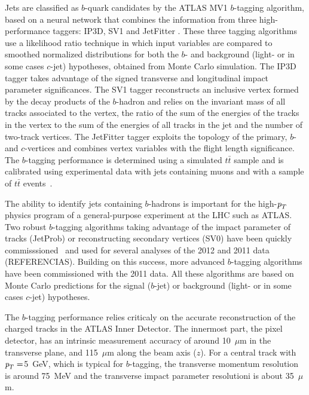 \begin{itemize}
Jets are classified as $b$-quark candidates by the ATLAS MV1 $b$-tagging algorithm, based on a neural network that combines the information from three high-performance taggers: IP3D, SV1 and JetFitter \cite{ATLAS-CONF-2011-102}.  These three tagging algorithms use a likelihood ratio technique in which input variables are compared to smoothed normalized distributions for both the $b$- and background (light- or in some cases $c$-jet) hypotheses, obtained from Monte Carlo simulation.  The IP3D tagger takes advantage of the signed transverse and longitudinal impact parameter significances. The SV1 tagger reconstructs an inclusive vertex formed by the decay products of the $b$-hadron and relies on the invariant mass of all tracks associated to the vertex, the ratio of the sum of the energies of the tracks in the vertex to the sum of the energies of all tracks in the jet and the number of two-track vertices. The JetFitter tagger exploits the topology of the primary, $b$- and $c$-vertices and combines vertex variables with the flight length significance.  The $b$-tagging performance is determined using a simulated $t\bar{t}$ sample and is calibrated using experimental data with jets containing muons and with a sample of $t\bar{t}$ events~\cite{ATLAS-CONF-2011-089}.




The ability to identify jets containing $b$-hadrons is important for the high-${\emph{p}_{T}}$ physics program of a general-purpose experiment at the LHC such as ATLAS. Two robust $b$-tagging algorithms taking advantage of the impact parameter of tracks (JetProb) or reconstructing secondary vertices (SV0) have been quickly commisssioned~\cite{ATLAS-CONF-2010-091}\cite{ATLAS-CONF-2010-042} and used for several analyses of the 2012 and 2011 data (REFERENCIAS).
Building on this success, more advanced $b$-tagging algorithms have been commissioned with the 2011 data. All these algorithms are based on Monte Carlo predictions for the signal ($b$-jet) or background (light- or in some cases $c$-jet) hypotheses.

The $b$-tagging performance relies criticaly on the accurate reconstruction of the charged tracks in the ATLAS Inner Detector. 
The innermost part, the pixel detector, has an intrinsic measurement accuracy of around 10~$\mu$m in the transverse plane, and 115~$\mu$m along the beam axis ($z$).  For a central track with ${\emph{p}_{T}}=$5~GeV, which is typical for $b$-tagging, the transverse momentum resolution is around 75~MeV and the transverse impact parameter resolutioni is about 35~$\mu$m.


\end{itemize}
